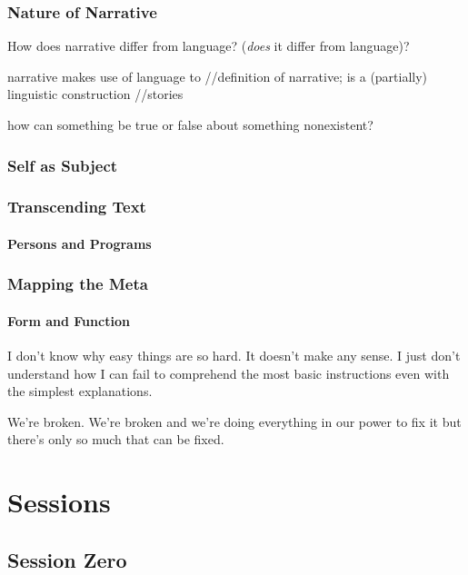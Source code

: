 \documentclass[10pt,twoside,twocolumn,openany,nomultitoc]{book}
\begin{document}
\section{Nature of Narrative}\vspace{2pt}
How does narrative differ from language? (\textit{does} it differ from language)? 

narrative makes use of language to //definition of narrative; is a (partially) linguistic construction
//stories

how can something be true or false about something nonexistent?

\section{Self as Subject}

\section{Transcending Text}
\subsection{Persons and Programs}

\section{Mapping the Meta}
  
\subsection{Form and Function}


I don't know why easy things are so hard. It doesn't make any sense. I just don't understand how I can fail to comprehend the most basic instructions even with the simplest explanations.

We're broken. We're broken and we're doing everything in our power to fix it but there's only so much that can be fixed.

\part{Sessions}

\chapter{Session Zero}\vspace{6pt}
\end{document}
